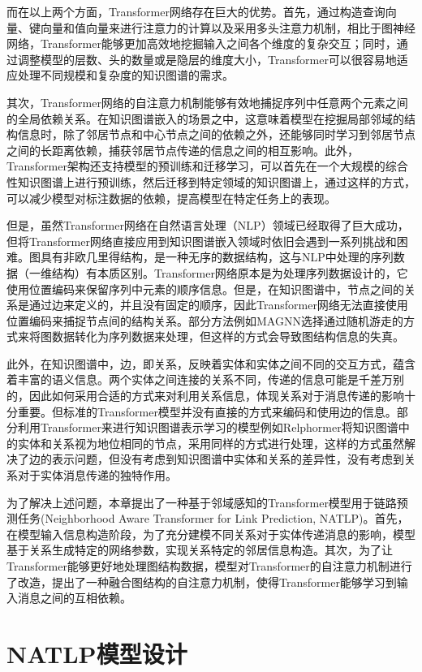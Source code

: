 而在以上两个方面，Transformer网络存在巨大的优势。首先，通过构造查询向量、键向量和值向量来进行注意力的计算以及采用多头注意力机制，相比于图神经网络，Transformer能够更加高效地挖掘输入之间各个维度的复杂交互；同时，通过调整模型的层数、头的数量或是隐层的维度大小，Transformer可以很容易地适应处理不同规模和复杂度的知识图谱的需求。

其次，Transformer网络的自注意力机制能够有效地捕捉序列中任意两个元素之间的全局依赖关系。在知识图谱嵌入的场景之中，这意味着模型在挖掘局部邻域的结构信息时，除了邻居节点和中心节点之间的依赖之外，还能够同时学习到邻居节点之间的长距离依赖，捕获邻居节点传递的信息之间的相互影响。此外，Transformer架构还支持模型的预训练和迁移学习，可以首先在一个大规模的综合性知识图谱上进行预训练，然后迁移到特定领域的知识图谱上，通过这样的方式，可以减少模型对标注数据的依赖，提高模型在特定任务上的表现。

但是，虽然Transformer网络在自然语言处理（NLP）领域已经取得了巨大成功，但将Transformer网络直接应用到知识图谱嵌入领域时依旧会遇到一系列挑战和困难。图具有非欧几里得结构，是一种无序的数据结构，这与NLP中处理的序列数据（一维结构）有本质区别。Transformer网络原本是为处理序列数据设计的，它使用位置编码来保留序列中元素的顺序信息。但是，在知识图谱中，节点之间的关系是通过边来定义的，并且没有固定的顺序，因此Transformer网络无法直接使用位置编码来捕捉节点间的结构关系。部分方法例如MAGNN选择通过随机游走的方式来将图数据转化为序列数据来处理，但这样的方式会导致图结构信息的失真。

此外，在知识图谱中，边，即关系，反映着实体和实体之间不同的交互方式，蕴含着丰富的语义信息。两个实体之间连接的关系不同，传递的信息可能是千差万别的，因此如何采用合适的方式来对利用关系信息，体现关系对于消息传递的影响十分重要。但标准的Transformer模型并没有直接的方式来编码和使用边的信息。部分利用Transformer来进行知识图谱表示学习的模型例如Relphormer将知识图谱中的实体和关系视为地位相同的节点，采用同样的方式进行处理，这样的方式虽然解决了边的表示问题，但没有考虑到知识图谱中实体和关系的差异性，没有考虑到关系对于实体消息传递的独特作用。

为了解决上述问题，本章提出了一种基于邻域感知的Transformer模型用于链路预测任务(Neighborhood Aware Transformer for Link Prediction, NATLP)。首先，在模型输入信息构造阶段，为了充分建模不同关系对于实体传递消息的影响，模型基于关系生成特定的网络参数，实现关系特定的邻居信息构造。其次，为了让Transformer能够更好地处理图结构数据，模型对Transformer的自注意力机制进行了改造，提出了一种融合图结构的自注意力机制，使得Transformer能够学习到输入消息之间的互相依赖。

\section{NATLP模型设计}

